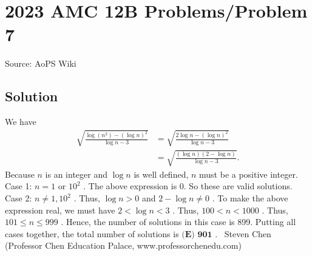 \documentclass[12pt]{article}
\begin{document}
\section*{{2023 AMC 12B Problems/Problem 7}}
Source: AoPS Wiki

\subsection*{Solution}
We have \begin{align*} \sqrt{\frac{\log \left( n^2 \right) - \left( \log n \right)^2}{\log n - 3}} & = \sqrt{\frac{2 \log n - \left( \log n \right)^2}{\log n - 3}} \\ & = \sqrt{\frac{\left( \log n \right) \left( 2 - \log n\right)}{\log n - 3}} . \end{align*} Because $n$ is an integer and $\log n$ is well defined, $n$ must be a positive integer. Case 1: $n = 1$ or $10^2$ . The above expression is 0. So these are valid solutions. Case 2: $n \neq 1, 10^2$ . Thus, $\log n > 0$ and $2 - \log n \neq 0$ .
To make the above expression real, we must have $2 < \log n < 3$ .
Thus, $100 < n < 1000$ .
Thus, $101 \leq n \leq 999$ .
Hence, the number of solutions in this case is 899. Putting all cases together, the total number of solutions is $\boxed{\textbf{(E) 901}}$ . ~Steven Chen (Professor Chen Education Palace, www.professorchenedu.com)
\end{document}
